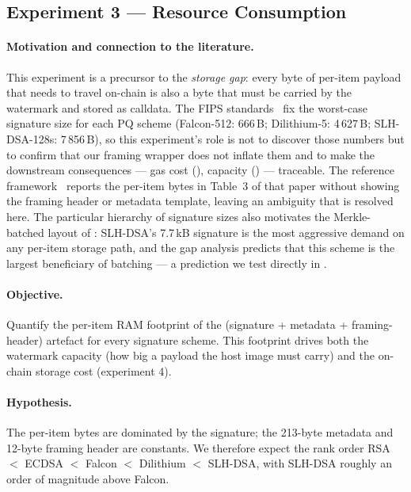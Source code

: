 \documentclass[11pt,a4paper]{article}
\theoremstyle{definition}
\theoremstyle{plain}
\theoremstyle{remark}
\begin{document}
\subsection{Experiment 3 --- Resource Consumption}\label{sec:exp3}

\paragraph{Motivation and connection to the literature.}
This experiment is a precursor to the \emph{storage gap}: every byte
of per-item payload that needs to travel on-chain is also a byte
that must be carried by the watermark and stored as calldata. The
FIPS standards~\cite{bib32,bib33} fix the worst-case signature size
for each PQ scheme (Falcon-512: 666\,B; Dilithium-5: 4\,627\,B;
SLH-DSA-128s: 7\,856\,B), so this experiment's role is not to
discover those numbers but to confirm that our framing wrapper does
not inflate them and to make the downstream consequences --- gas
cost (), capacity () --- traceable.
The reference framework~\cite{bib4} reports the per-item bytes in
Table~3 of that paper without showing the framing header or
metadata template, leaving an ambiguity that is resolved here. The
particular hierarchy of signature sizes also motivates the Merkle-
batched layout of : SLH-DSA's 7.7\,kB signature is
the most aggressive demand on any per-item storage path, and the
gap analysis predicts that this scheme is the largest beneficiary
of batching --- a prediction we test directly in
.

\paragraph{Objective.}
Quantify the per-item RAM footprint of the
(signature + metadata + framing-header) artefact for every signature
scheme. This footprint drives both the watermark capacity (how big a
payload the host image must carry) and the on-chain storage cost
(experiment 4).

\paragraph{Hypothesis.}
The per-item bytes are dominated by the signature; the 213-byte
metadata and 12-byte framing header are constants. We therefore
expect the rank order RSA $\!<\!$ ECDSA $\!<\!$ Falcon $\!<\!$
Dilithium $\!<\!$ SLH-DSA, with SLH-DSA roughly an order of magnitude
above Falcon.
\end{document}
